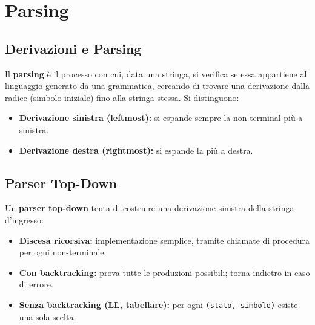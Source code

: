\section{Parsing}
\subsection{Derivazioni e Parsing}
Il \textbf{parsing} è il processo con cui, data una stringa, si verifica se essa appartiene al linguaggio generato da una grammatica, cercando di trovare una derivazione dalla radice (simbolo iniziale) fino alla stringa stessa. Si distinguono:
\begin{itemize}
    \item \textbf{Derivazione sinistra (leftmost):} si espande sempre la non-terminal più a sinistra.
    \item \textbf{Derivazione destra (rightmost):} si espande la più a destra.
\end{itemize}

  
  

\subsection{Parser Top-Down}
Un \textbf{parser top-down} tenta di costruire una derivazione sinistra della stringa d’ingresso:
\begin{itemize}
    \item \textbf{Discesa ricorsiva:} implementazione semplice, tramite chiamate di procedura per ogni non-terminale.
    \item \textbf{Con backtracking:} prova tutte le produzioni possibili; torna indietro in caso di errore.
    \item \textbf{Senza backtracking (LL, tabellare):} per ogni \texttt{(stato, simbolo)} esiste una sola scelta.
\end{itemize}

